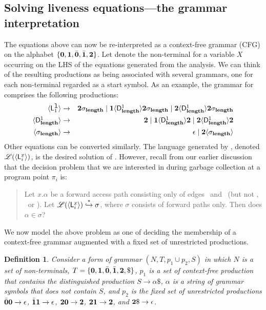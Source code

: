 \documentclass[9pt]{sigplanconf}
\newtheorem{definition}[theorem]{Definition}
\begin{document}
\subsection{Solving liveness equations---the grammar
interpretation}\label{sec:grammar-formulation}
The  equations above can now be re-interpreted as a
context-free grammar (CFG)  on the alphabet $\lbrace\mathbf{0}, \mathbf{1},
\bar{\mathbf{0}}, \bar{\mathbf{1}}, {\mathbf{2}}\rbrace$.  Let   denote the non-terminal
for
a variable  $X$ occurring on  the LHS of the  equations generated
from the analysis.  We can  think of the resulting productions as
being associated with several  grammars, one for each non-terminal
 regarded as a start symbol.  As an example, the
grammar    for      comprises    the   following
productions:
 \begin{eqnarray*}
\var{\Lanv{1}{\xl}}  &\rightarrow&   \clazy\sigma_{\length} \mid \acdr
\var{\Df
  {\length}{1}}{\clazy\sigma_{\length}} \mid
  \clazy\var{\Df{\length}{1}}{\clazy\sigma_{\length}} \\
  \var{\Df{\length}{1}} &\rightarrow& \clazy \mid
  \acdr\var{\Df{\length}{1}}\clazy
       \mid \clazy\var{\Df{\length}{1}}{\clazy}\\
\langle {\sigma_{\length}} \rangle
&\rightarrow&
\epsilon  \mid \clazy\langle{\sigma_{\length}}\rangle
\end{eqnarray*}
Other equations can be converted similarly.  The language generated by
,  denoted $\mathscr{L}(\var{\Lanv{i}{x}}) $,  is the
desired  solution of  .  However,  recall from  our earlier
discussion that the decision problem  that we are interested in during
garbage collection at a program point $\pi_i$ is:
\begin{quote}
Let  $x.\alpha$ be  a forward  access  path consisting  only of  edges
\acar\    and   \acdr\    (but    not   \bcar, \bcdr\ or \clazy).     Let
$\mathscr{L}(\var{\Lanv{i}{x}}) \stackrel{*}{\hookrightarrow} \sigma$,
where $\sigma$ consists  of forward paths only. Then  does $\alpha \in
\sigma$?
\end{quote}

We now model the above problem  as one of deciding the membership of a
context-free  grammar  augmented  with  a fixed  set  of  unrestricted
productions.

\begin{definition}\label{def:specialgrammar}
Consider a form of  grammar $(N,T, p_1\cup p_2,S)$ in which $N$ is a set of
non-terminals, $T = \{\mathbf{0}, \mathbf{1}, \bar{\mathbf{0}}, \bar{\mathbf{1}}, {\mathbf{2}}, \$\}$, $p_1$
is a set of context-free production that contains the distinguished
production $S \rightarrow \alpha\$$, $\alpha$ is a string of grammar
symbols that does not contain $S$, and $p_2$ is the fixed set of
unrestricted productions $\bar{\mathbf{0}}\mathbf{0} \rightarrow \epsilon$,
$\bar{\mathbf{1}}\mathbf{1} \rightarrow \epsilon$, ${\mathbf{2}}\mathbf{0} \rightarrow {\mathbf{2}}$,
${\mathbf{2}}\mathbf{1} \rightarrow {\mathbf{2}}$, and ${\mathbf{2}}\$ \rightarrow
\epsilon$.
\end{definition}
\end{document}
